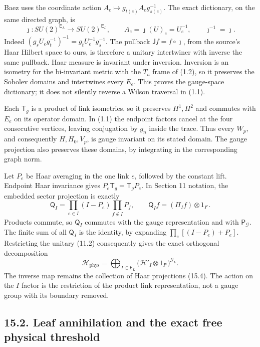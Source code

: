 \documentclass[
]{article}
\begin{document}
Baez uses the coordinate action \(A_e\mapsto g_{t(e)}A_eg_{s(e)}^{-1}\).
The exact dictionary, on the same directed graph, is \[
\jmath:SU(2)^{\mathsf E_L}\longrightarrow SU(2)^{\mathsf E_L},
\qquad
A_e=\jmath(U)_e=U_e^{-1},\qquad \jmath^{-1}=\jmath.             \tag{15.3}
\] Indeed \((g_sU_eg_t^{-1})^{-1}=g_tU_e^{-1}g_s^{-1}\). The pullback
\(\mathsf Jf=f\circ\jmath\), from the source's Haar Hilbert space to
ours, is therefore a unitary intertwiner with inverse the same pullback.
Haar measure is invariant under inversion. Inversion is an isometry for
the bi-invariant metric with the \(T_a\) frame of (1.2), so it preserves
the Sobolev domains and intertwines every \(E_e\). This proves the
gauge-space dictionary; it does not silently reverse a Wilson traversal
in (1.1).

Each \(\mathsf T_g\) is a product of link isometries, so it preserves
\(H^1,H^2\) and commutes with \(E_e\) on its operator domain. In (1.1)
the endpoint factors cancel at the four consecutive vertices, leaving
conjugation by \(g_n\) inside the trace. Thus every \(W_p\), and
consequently \(H,H_0,V_p\), is gauge invariant on its stated domain. The
gauge projection also preserves these domains, by integrating in the
corresponding graph norm.

Let \(P_e\) be Haar averaging in the one link \(e\), followed by the
constant lift. Endpoint Haar invariance gives
\(P_e\mathsf T_g=\mathsf T_gP_e\). In Section 11 notation, the embedded
sector projection is exactly \[
\mathsf Q_I=
 \prod_{e\in I}(I-P_e)\prod_{f\notin I}P_f,
\qquad
\mathsf Q_If=(\Pi_If)\otimes1_{I^c}.                         \tag{15.4}
\] Products commute, so \(\mathsf Q_I\) commutes with the gauge
representation and with \(\mathsf P_{\mathcal G}\). The finite sum of
all \(\mathsf Q_I\) is the identity, by expanding
\(\prod_e[(I-P_e)+P_e]\). Restricting the unitary (11.2) consequently
gives the exact orthogonal decomposition \[
\mathcal H_{\mathrm{phys}}
 =\bigoplus_{I\subset\mathsf E_L}
     \bigl(\mathcal H'_I\otimes1_{I^c}\bigr)^{\mathcal G_L}.
                                                               \tag{15.5}
\] The inverse map remains the collection of Haar projections (15.4).
The action on the \(I\) factor is the restriction of the product link
representation, not a gauge group with its boundary removed.

\subsection{15.2. Leaf annihilation and the exact free physical
threshold}\label{leaf-annihilation-and-the-exact-free-physical-threshold}
\end{document}
